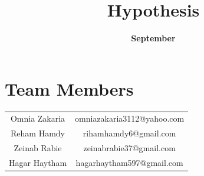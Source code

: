 \documentclass[12pt]{article}
\title{{\textbf{Hypothesis}}}
\author{{\textbf{September}}}
\begin{document}
\maketitle
\section{{\large Team Members}}
\begin{center}
	\begin{tabular}{ |c|c| } 
		\hline
		Omnia Zakaria & omniazakaria3112@yahoo.com \\ 
		Reham Hamdy   & rihamhamdy6@gmail.com\\ 
		Zeinab Rabie  & zeinabrabie37@gmail.com\\ 
		Hagar Haytham & hagarhaytham597@gmail.com\\
		\hline
	\end{tabular}
\end{center}
\end{document}
